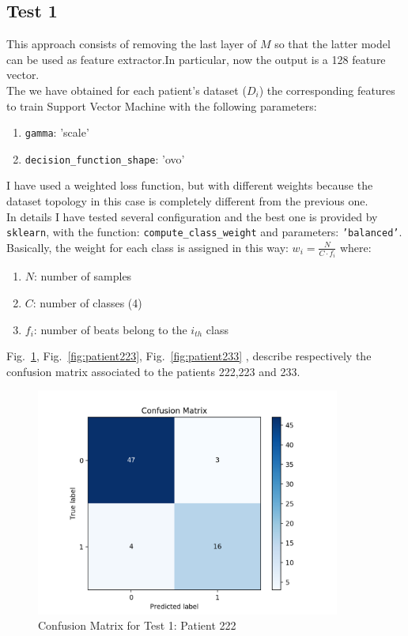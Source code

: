 \documentclass[LaM,binding=0.6cm]{sapthesis}
\begin{document}
\subsection{Test 1}
This approach consists of removing the last layer of $M$ so that the latter model can be used as feature extractor.In particular, now the output is a 128 feature vector.\\The we have obtained for each patient's dataset ($D_i$) the corresponding features to train Support Vector Machine with the following parameters:
\begin{enumerate}
\item \texttt{gamma}: 'scale'
\item \texttt{decision\_function\_shape}: 'ovo'
\end{enumerate}
I have used a weighted loss function, but with different weights because the dataset topology in this case is completely different from the previous one.\\In details I have tested several configuration and the best one is provided by \texttt{sklearn}, with the function: \texttt{compute\_class\_weight} and parameters: \texttt{'balanced'}.\\Basically, the weight for each class is assigned in this way: $w_i = \frac{N}{C\cdot f_i}$ where:
\begin{enumerate}
\item $N$: number of samples
\item $C$: number of classes (4)
\item $f_i$: number of beats belong to the $i_{th}$ class
\end{enumerate}
Fig.~\ref{fig:patient222}, Fig.~\ref{fig:patient223}, Fig.~\ref{fig:patient233} , describe respectively the confusion matrix associated to the patients 222,223 and 233.
\begin{figure}[H]  \centering
    \includegraphics[width=100mm,scale=0.7]{patient222}
    \caption{Confusion Matrix for Test 1: Patient 222 }
    \label{fig:patient222}
\end{figure}
\end{document}
